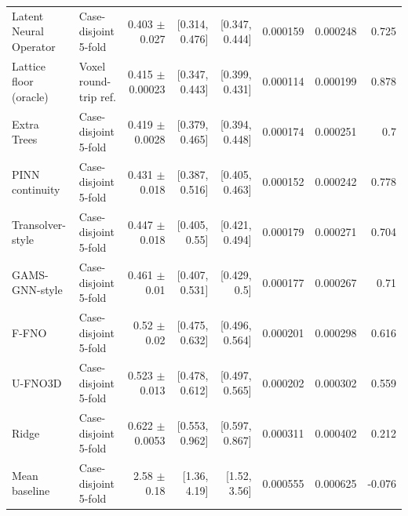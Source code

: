 \begin{landscape}
\begin{longtable}{p{3.8cm}p{2.9cm}rrrrrr}
Latent Neural Operator & Case-disjoint 5-fold & 0.403 $\pm$ 0.027 & [0.314, 0.476] & [0.347, 0.444] & 0.000159 & 0.000248 & 0.725 \\
Lattice floor (oracle) & Voxel round-trip ref. & 0.415 $\pm$ 0.00023 & [0.347, 0.443] & [0.399, 0.431] & 0.000114 & 0.000199 & 0.878 \\
Extra Trees & Case-disjoint 5-fold & 0.419 $\pm$ 0.0028 & [0.379, 0.465] & [0.394, 0.448] & 0.000174 & 0.000251 & 0.7 \\
PINN continuity & Case-disjoint 5-fold & 0.431 $\pm$ 0.018 & [0.387, 0.516] & [0.405, 0.463] & 0.000152 & 0.000242 & 0.778 \\
Transolver-style & Case-disjoint 5-fold & 0.447 $\pm$ 0.018 & [0.405, 0.55] & [0.421, 0.494] & 0.000179 & 0.000271 & 0.704 \\
GAMS-GNN-style & Case-disjoint 5-fold & 0.461 $\pm$ 0.01 & [0.407, 0.531] & [0.429, 0.5] & 0.000177 & 0.000267 & 0.71 \\
F-FNO & Case-disjoint 5-fold & 0.52 $\pm$ 0.02 & [0.475, 0.632] & [0.496, 0.564] & 0.000201 & 0.000298 & 0.616 \\
U-FNO3D & Case-disjoint 5-fold & 0.523 $\pm$ 0.013 & [0.478, 0.612] & [0.497, 0.565] & 0.000202 & 0.000302 & 0.559 \\
Ridge & Case-disjoint 5-fold & 0.622 $\pm$ 0.0053 & [0.553, 0.962] & [0.597, 0.867] & 0.000311 & 0.000402 & 0.212 \\
Mean baseline & Case-disjoint 5-fold & 2.58 $\pm$ 0.18 & [1.36, 4.19] & [1.52, 3.56] & 0.000555 & 0.000625 & -0.076 \\
\bottomrule\end{longtable}\end{landscape}

